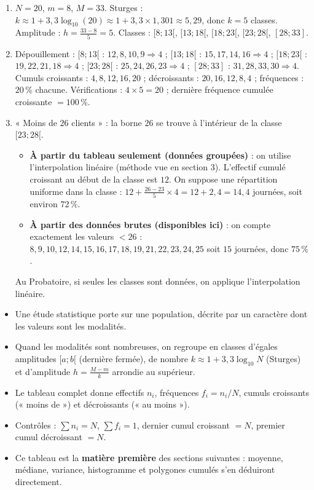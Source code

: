 \documentclass[11pt]{article}
\newcommand{\cle}[1]{{\popxbold\color{popdark}#1}}
\begin{document}
\begin{corrige}[Exercice 1]
\begin{enumerate}
\item $N = 20$, $m = 8$, $M = 33$. Sturges : $k \approx 1 + 3{,}3\log_{10}(20) \approx 1 + 3{,}3 \times 1{,}301 \approx 5{,}29$, donc $k = 5$ classes. Amplitude : $h = \frac{33-8}{5} = 5$. Classes : $[8;13[$, $[13;18[$, $[18;23[$, $[23;28[$, $[28;33]$.
\item Dépouillement : 
$[8;13[$ : $12, 8, 10, 9 \Rightarrow 4$ ; 
$[13;18[$ : $15, 17, 14, 16 \Rightarrow 4$ ; 
$[18;23[$ : $19, 22, 21, 18 \Rightarrow 4$ ; 
$[23;28[$ : $25, 24, 26, 23 \Rightarrow 4$ ; 
$[28;33]$ : $31, 28, 33, 30 \Rightarrow 4$. 
Cumuls croissants : $4, 8, 12, 16, 20$ ; décroissants : $20, 16, 12, 8, 4$ ; fréquences : $20\,\%$ chacune. Vérifications : $4\times 5 = 20$ ; dernière fréquence cumulée croissante $= 100\,\%$.
\item « Moins de $26$ clients » : la borne $26$ se trouve à l'intérieur de la classe $[23;28[$.
    \begin{itemize}
    \item \textbf{À partir du tableau seulement (données groupées)} : on utilise l'interpolation linéaire (méthode vue en section 3). L'effectif cumulé croissant au début de la classe est $12$. On suppose une répartition uniforme dans la classe : $12 + \frac{26-23}{5} \times 4 = 12 + 2,4 = 14,4$ journées, soit environ $72\,\%$.
    \item \textbf{À partir des données brutes (disponibles ici)} : on compte exactement les valeurs $< 26$ : $8, 9, 10, 12, 14, 15, 16, 17, 18, 19, 21, 22, 23, 24, 25$ soit $15$ journées, donc $75\,\%$.
    \end{itemize}
    Au Probatoire, si seules les classes sont données, on applique l'interpolation linéaire.
\end{enumerate}
\end{corrige}

\begin{aretenir}
\begin{itemize}
\item Une étude statistique porte sur une \cle{population}, décrite par un \cle{caractère} dont les valeurs sont les \cle{modalités}.
\item Quand les modalités sont nombreuses, on regroupe en \cle{classes d'égales amplitudes} $[a ; b[$ (dernière fermée), de nombre $k \approx 1 + 3{,}3\log_{10} N$ (Sturges) et d'amplitude $h = \frac{M-m}{k}$ arrondie au supérieur.
\item Le tableau complet donne effectifs $n_i$, fréquences $f_i = n_i/N$, cumuls croissants (« moins de ») et décroissants (« au moins »).
\item Contrôles : $\sum n_i = N$, $\sum f_i = 1$, dernier cumul croissant $= N$, premier cumul décroissant $= N$.
\item Ce tableau est la \textbf{matière première} des sections suivantes : moyenne, médiane, variance, histogramme et polygones cumulés s'en déduiront directement.
\end{itemize}
\end{aretenir}
\end{document}
